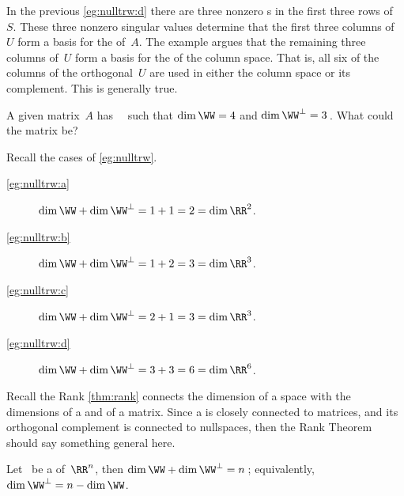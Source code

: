 \begin{reduce}
\begin{example}
\begin{enumerate}[ref=\ref{eg:nulltrw}(\alph*)]
\end{enumerate}
\end{example}


In the previous \cref{eg:nulltrw:d} there are three nonzero s in the first three rows of~\(S\).
These three nonzero singular values determine that the first three columns of~\(U\) form a basis for the  of~\(A\).
The example argues that the remaining three columns of~\(U\) form a basis for the  of the column space.
That is, all six of the columns of the orthogonal~\(U\) are used in either the column space or its complement.
This is generally true.

\begin{activity}
A given matrix~\(A\) has ~\WW\ such that \(\dim\WW=4\) and \(\dim\WW^\perp=3\)\,.  
What  could the matrix be?
\end{activity}



\begin{example} \label{eg:orthrank}
Recall the cases of \cref{eg:nulltrw}.
\begin{description}
\item[\ref{eg:nulltrw:a}] \(\dim\WW+\dim\WW^\perp=1+1=2=\dim\RR^2\).
\item[\ref{eg:nulltrw:b}] \(\dim\WW+\dim\WW^\perp=1+2=3=\dim\RR^3\).
\item[\ref{eg:nulltrw:c}] \(\dim\WW+\dim\WW^\perp=2+1=3=\dim\RR^3\).
\item[\ref{eg:nulltrw:d}] \(\dim\WW+\dim\WW^\perp=3+3=6=\dim\RR^6\).
\end{description}
\end{example}

Recall the Rank \cref{thm:rank} connects the  dimension of a space with the dimensions of a  and  of a matrix.
Since a  is closely connected to matrices, and its orthogonal complement is connected to nullspaces, then the Rank Theorem should say something general here.



\begin{theorem} \label{thm:orthrank}
Let \WW\ be a  of~\(\RR^n\), then \(\dim\WW+\dim\WW^\perp=n\)\,; equivalently, \(\dim\WW^\perp=n-\dim\WW\).
\end{theorem}


\end{reduce}
